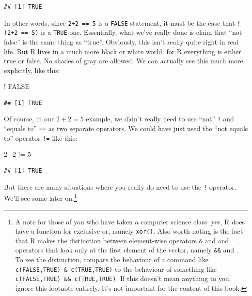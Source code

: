 \documentclass[
]{book}
\newenvironment{Shaded}{\begin{snugshade}}{\end{snugshade}}
\newcommand{\ConstantTok}[1]{\textcolor[rgb]{0.00,0.00,0.00}{#1}}
\newcommand{\DecValTok}[1]{\textcolor[rgb]{0.00,0.00,0.81}{#1}}
\newcommand{\SpecialCharTok}[1]{\textcolor[rgb]{0.00,0.00,0.00}{#1}}
\begin{document}
\begin{verbatim}
## [1] TRUE
\end{verbatim}

In other words, since \texttt{2+2\ ==\ 5} is a \texttt{FALSE} statement, it must be the case that \texttt{!(2+2\ ==\ 5)} is a \texttt{TRUE} one. Essentially, what we've really done is claim that ``not false'' is the same thing as ``true''. Obviously, this isn't really quite right in real life. But R lives in a much more black or white world: for R everything is either true or false. No shades of gray are allowed. We can actually see this much more explicitly, like this:

\begin{Shaded}
\begin{Highlighting}[]
\SpecialCharTok{!} \ConstantTok{FALSE}
\end{Highlighting}
\end{Shaded}

\begin{verbatim}
## [1] TRUE
\end{verbatim}

Of course, in our \(2+2 = 5\) example, we didn't really need to use ``not'' \texttt{!} and ``equals to'' \texttt{==} as two separate operators. We could have just used the ``not equals to'' operator \texttt{!=} like this:

\begin{Shaded}
\begin{Highlighting}[]
\DecValTok{2}\SpecialCharTok{+}\DecValTok{2} \SpecialCharTok{!=} \DecValTok{5}
\end{Highlighting}
\end{Shaded}

\begin{verbatim}
## [1] TRUE
\end{verbatim}

But there are many situations where you really do need to use the \texttt{!} operator. We'll see some later on.\footnote{A note for those of you who have taken a computer science class: yes, R does have a function for exclusive-or, namely \texttt{xor()}. Also worth noting is the fact that R makes the distinction between element-wise operators \texttt{\&} and \texttt{\textbar{}} and operators that look only at the first element of the vector, namely \texttt{\&\&} and \texttt{\textbar{}\textbar{}}. To see the distinction, compare the behaviour of a command like \texttt{c(FALSE,TRUE)\ \&\ c(TRUE,TRUE)} to the behaviour of something like \texttt{c(FALSE,TRUE)\ \&\&\ c(TRUE,TRUE)}. If this doesn't mean anything to you, ignore this footnote entirely. It's not important for the content of this book.}
\end{document}
